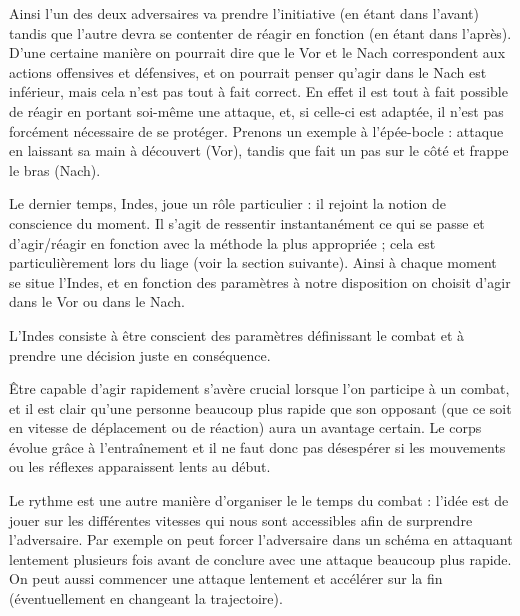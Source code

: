 Ainsi l'un des deux adversaires va prendre l'initiative (en étant dans l'avant) tandis que l'autre devra se contenter de réagir en fonction (en étant dans l'après).
D'une certaine manière on pourrait dire que le Vor et le Nach correspondent aux actions offensives et défensives, et on pourrait penser qu'agir dans le Nach est inférieur, mais cela n'est pas tout à fait correct.
En effet il est tout à fait possible de réagir en portant soi-même une attaque, et, si celle-ci est adaptée, il n'est pas forcément nécessaire de se protéger.
Prenons un exemple à l'épée-bocle : \A attaque en laissant sa main à découvert (Vor), tandis que \D fait un pas sur le côté et frappe le bras (Nach).


Le dernier temps, Indes, joue un rôle particulier : il rejoint la notion de conscience du moment.
Il s'agit de ressentir instantanément ce qui se passe et d'agir/réagir en fonction avec la méthode la plus appropriée ; cela est particulièrement lors du liage (voir la section suivante).
Ainsi à chaque moment se situe l'Indes, et en fonction des paramètres à notre disposition on choisit d'agir dans le Vor ou dans le Nach.

\begin{definition}

L'Indes consiste à être conscient des paramètres définissant le combat et à prendre une décision juste en conséquence.
\end{definition}


Être capable d'agir rapidement s'avère crucial lorsque l'on participe à un combat, et il est clair qu'une personne beaucoup plus rapide que son opposant (que ce soit en vitesse de déplacement ou de réaction) aura un avantage certain.
Le corps évolue grâce à l'entraînement et il ne faut donc pas désespérer si les mouvements ou les réflexes apparaissent lents au début.

Le rythme est une autre manière d'organiser le le temps du combat : l'idée est de jouer sur les différentes vitesses qui nous sont accessibles afin de surprendre l'adversaire.
Par exemple on peut forcer l'adversaire dans un schéma en attaquant lentement plusieurs fois avant de conclure avec une attaque beaucoup plus rapide.
On peut aussi commencer une attaque lentement et accélérer sur la fin (éventuellement en changeant la trajectoire).


